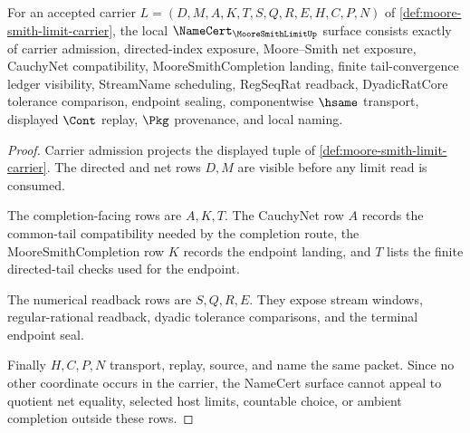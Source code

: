 \begin{theorem}
\label{thm:moore-smith-limit-namecert-obligations}
For an accepted carrier $L=(D,M,A,K,T,S,Q,R,E,H,C,P,N)$ of \autoref{def:moore-smith-limit-carrier}, the local $\NameCert_{\MooreSmithLimitUp}$ surface consists exactly of carrier admission, directed-index exposure, Moore--Smith net exposure, CauchyNet compatibility, MooreSmithCompletion landing, finite tail-convergence ledger visibility, StreamName scheduling, RegSeqRat readback, DyadicRatCore tolerance comparison, endpoint sealing, componentwise $\hsame$ transport, displayed $\Cont$ replay, $\Pkg$ provenance, and local naming.
\end{theorem}
\begin{proof}
Carrier admission projects the displayed tuple of \autoref{def:moore-smith-limit-carrier}. The directed and net rows $D,M$ are visible before any limit read is consumed.

The completion-facing rows are $A,K,T$. The CauchyNet row $A$ records the common-tail compatibility needed by the completion route, the MooreSmithCompletion row $K$ records the endpoint landing, and $T$ lists the finite directed-tail checks used for the endpoint.

The numerical readback rows are $S,Q,R,E$. They expose stream windows, regular-rational readback, dyadic tolerance comparisons, and the terminal endpoint seal.

Finally $H,C,P,N$ transport, replay, source, and name the same packet. Since no other coordinate occurs in the carrier, the NameCert surface cannot appeal to quotient net equality, selected host limits, countable choice, or ambient completion outside these rows.
\end{proof}

